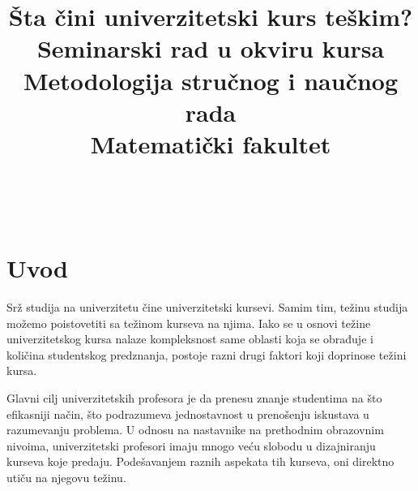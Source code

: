 \documentclass[a4paper]{article}
\begin{document}
\title{Šta čini univerzitetski kurs teškim?\\ \small{Seminarski rad u okviru kursa\\Metodologija stručnog i naučnog rada\\ Matematički fakultet}}

\author{
     \\ 
     \\
}


\maketitle


\tableofcontents

\newpage

\section{Uvod}
\label{sec:uvod}

Srž studija na univerzitetu čine univerzitetski kursevi. Samim tim, težinu studija možemo poistovetiti sa težinom kurseva na njima. Iako se u osnovi težine univerzitetskog kursa nalaze kompleksnost same oblasti koja se obrađuje i količina studentskog predznanja, postoje razni drugi faktori koji doprinose težini kursa.

Glavni cilj univerzitetskih profesora je da prenesu znanje studentima na što efikasniji način, što podrazumeva jednostavnost u prenošenju iskustava u razumevanju problema. U odnosu na nastavnike na prethodnim obrazovnim nivoima, univerzitetski profesori imaju mnogo veću slobodu u dizajniranju kurseva koje predaju. Podešavanjem raznih aspekata tih kurseva, oni direktno utiču na njegovu težinu.
\end{document}
